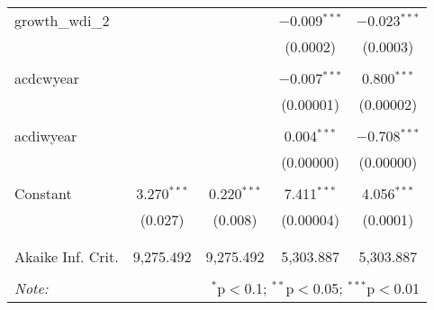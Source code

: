 \begin{table}[!htbp]
\begin{tabular}{@{\extracolsep{5pt}}lcccc}
 growth\_wdi\_2 &  &  & $-$0.009$^{***}$ & $-$0.023$^{***}$ \\ 
  &  &  & (0.0002) & (0.0003) \\ 
  & & & & \\ 
 acdcwyear &  &  & $-$0.007$^{***}$ & 0.800$^{***}$ \\ 
  &  &  & (0.00001) & (0.00002) \\ 
  & & & & \\ 
 acdiwyear &  &  & 0.004$^{***}$ & $-$0.708$^{***}$ \\ 
  &  &  & (0.00000) & (0.00000) \\ 
  & & & & \\ 
 Constant & 3.270$^{***}$ & 0.220$^{***}$ & 7.411$^{***}$ & 4.056$^{***}$ \\ 
  & (0.027) & (0.008) & (0.00004) & (0.0001) \\ 
  & & & & \\ 
\hline \\[-1.8ex] 
Akaike Inf. Crit. & 9,275.492 & 9,275.492 & 5,303.887 & 5,303.887 \\ 
\hline 
\hline \\[-1.8ex] 
\textit{Note:}  & \multicolumn{4}{r}{$^{*}$p$<$0.1; $^{**}$p$<$0.05; $^{***}$p$<$0.01} \\ 
\end{tabular} 
\end{table} 
